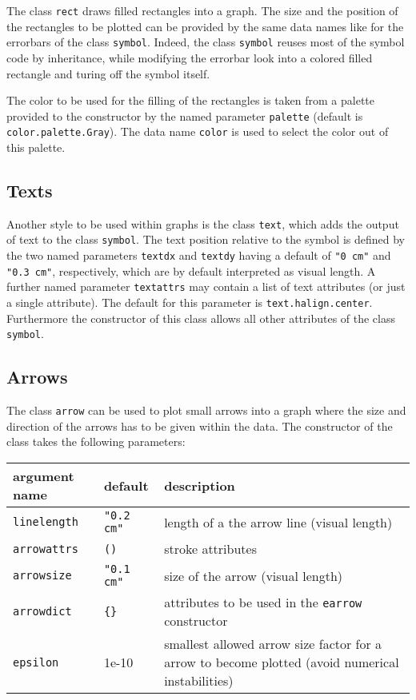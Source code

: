 The class \verb|rect| draws filled rectangles into a graph. The size
and the position of the rectangles to be plotted can be provided by
the same data names like for the errorbars of the class \verb|symbol|.
Indeed, the class \verb|symbol| reuses most of the symbol code by
inheritance, while modifying the errorbar look into a colored filled
rectangle and turing off the symbol itself.

The color to be used for the filling of the rectangles is taken from a
palette provided to the constructor by the named parameter
\verb|palette| (default is \verb|color.palette.Gray|). The data
name \verb|color| is used to select the color out of this palette.

\subsection{Texts}

Another style to be used within graphs is the class \verb|text|, which
adds the output of text to the class \verb|symbol|. The text
position relative to the symbol is defined by the two named
parameters \verb|textdx| and \verb|textdy| having a default of
\verb|"0 cm"| and \verb|"0.3 cm"|, respectively, which are by default
interpreted as visual length. A further named parameter
\verb|textattrs| may contain a list of text attributes (or just a
single attribute). The default for this parameter is
\verb|text.halign.center|. Furthermore the constructor of this class
allows all other attributes of the class \verb|symbol|.

\subsection{Arrows}

The class \verb|arrow| can be used to plot small arrows into a graph
where the size and direction of the arrows has to be given within the
data. The constructor of the class takes the following parameters:

\medskip
\begin{tabularx}{\linewidth}{ll>{\raggedright\arraybackslash}X}
argument name&default&description\\
\hline
\texttt{linelength}&\texttt{"0.2 cm"}&length of a the arrow line (visual length)\\
\texttt{arrowattrs}&\texttt{()}&stroke attributes\\
\texttt{arrowsize}&\texttt{"0.1 cm"}&size of the arrow (visual length)\\
\texttt{arrowdict}&\texttt{\{\}}&attributes to be used in the \texttt{earrow} constructor\\
\texttt{epsilon}&1e-10&smallest allowed arrow size factor for a arrow to become plotted (avoid numerical instabilities)\\
\end{tabularx}
\medskip

